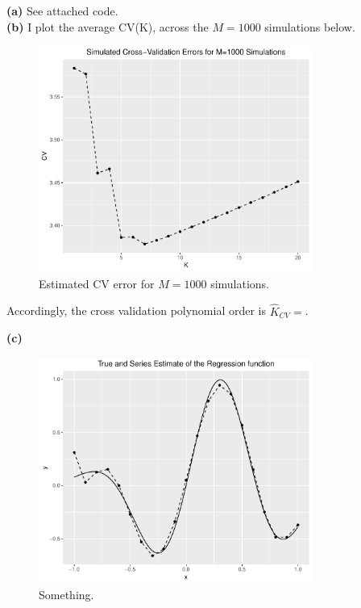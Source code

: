\documentclass[12pt]{article}
\begin{document}
\textbf{(a)} See attached code.\\

\textbf{(b)} I plot the average CV(K), across the $M=1000$ simulations below. 

\begin{figure}[h]
    \centering
    
        \includegraphics[width=0.8\textwidth]{Q2_CV.pdf}
        \caption{Estimated CV error for $M=1000$ simulations.}

\end{figure}



Accordingly, the cross validation polynomial order is $\hat K_{CV} = $.

\textbf{(c)}

\begin{figure}[h]
    \centering
    
        \includegraphics[width=0.8\textwidth]{Q2_diag.pdf}
        \caption{Something.}

\end{figure}
\end{document}
